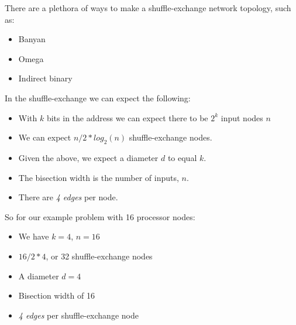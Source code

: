 \documentclass{article}
\begin{document}

\noindent There are a plethora of ways to make a shuffle-exchange network topology, such as:
\begin{itemize}
    \item Banyan
    \item Omega
    \item Indirect binary
\end{itemize}

\noindent In the shuffle-exchange we can expect the following:
\begin{itemize}
    \item With $k$ bits in the address we can expect there to be $2^k$ input nodes $n$
    \item We can expect $n / 2 * log_2(n)$ shuffle-exchange nodes.
    \item Given the above, we expect a diameter $d$ to equal $k$.
    \item The bisection width is the number of inputs, $n$.
    \item There are \textit{4 edges} per node.
\end{itemize}

\noindent So for our example problem with 16 processor nodes:
\begin{itemize}
    \item We have $k = 4$, $n = 16$
    \item $16 / 2 * 4$, or 32 shuffle-exchange nodes
    \item A diameter $d = 4$
    \item Bisection width of 16
    \item \textit{4 edges} per shuffle-exchange node
\end{itemize}
\end{document}
